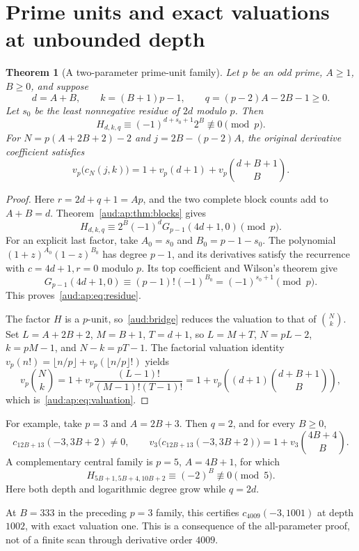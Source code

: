 \documentclass[11pt,a4paper]{article}
\numberwithin{equation}{section}
\newtheorem{theorem}{Theorem}[section]
\begin{document}
\section{Prime units and exact valuations at unbounded depth}
\begin{theorem}[A two-parameter prime-unit family]\label{aud:ap:thm:family}
Let $p$ be an odd prime, $A\ge1$, $B\ge0$, and suppose
\[
 d=A+B,\qquad k=(B+1)p-1,\qquad
 q=(p-2)A-2B-1\ge0.
\]
Let $s_0$ be the least nonnegative residue of $2d$ modulo $p$. Then
\begin{equation}\label{aud:ap:eq:residue}
 H_{d,k,q}\equiv(-1)^{d+s_0+1}2^B\not\equiv0\pmod p.
\end{equation}
For $N=p(A+2B+2)-2$ and $j=2B-(p-2)A$, the original derivative coefficient satisfies
\begin{equation}\label{aud:ap:eq:valuation}
 v_p\bigl(c_N(j,k)\bigr)
 =1+v_p(d+1)+v_p\binom{d+B+1}{B}.
\end{equation}
\end{theorem}
\begin{proof}
Here $r=2d+q+1=Ap$, and the two complete block counts add to $A+B=d$. Theorem~\ref{aud:ap:thm:blocks} gives
\[
 H_{d,k,q}\equiv2^B(-1)^dG_{p-1}(4d+1,0)\pmod p.
\]
For an explicit last factor, take $A_0=s_0$ and $B_0=p-1-s_0$. The polynomial $(1+z)^{A_0}(1-z)^{B_0}$ has degree $p-1$, and its derivatives satisfy the recurrence with $c=4d+1,r=0$ modulo $p$. Its top coefficient and Wilson's theorem give
\[
 G_{p-1}(4d+1,0)\equiv(p-1)!(-1)^{B_0}
 =(-1)^{s_0+1}\pmod p.
\]
This proves~\eqref{aud:ap:eq:residue}.

The factor $H$ is a $p$-unit, so~\eqref{aud:bridge} reduces the valuation to that of $\binom Nk$. Set $L=A+2B+2$, $M=B+1$, $T=d+1$, so $L=M+T$, $N=pL-2$, $k=pM-1$, and $N-k=pT-1$. The factorial valuation identity
$v_p(n!)=\lfloor n/p\rfloor+v_p(\lfloor n/p\rfloor!)$ yields
\[
 v_p\binom Nk
 =1+v_p\frac{(L-1)!}{(M-1)!(T-1)!}
 =1+v_p\left((d+1)\binom{d+B+1}{B}\right),
\]
which is~\eqref{aud:ap:eq:valuation}.
\end{proof}

For example, take $p=3$ and $A=2B+3$. Then $q=2$, and for every $B\ge0$,
\[
 c_{12B+13}(-3,3B+2)\ne0,\qquad
 v_3\bigl(c_{12B+13}(-3,3B+2)\bigr)
 =1+v_3\binom{4B+4}{B}.
\]
A complementary central family is $p=5$, $A=4B+1$, for which
\[
 H_{5B+1,5B+4,10B+2}\equiv(-2)^B\not\equiv0\pmod5.
\]
Here both depth and logarithmic degree grow while $q=2d$.

At $B=333$ in the preceding $p=3$ family, this certifies $c_{4009}(-3,1001)$ at depth $1002$, with exact valuation one. This is a consequence of the all-parameter proof, not of a finite scan through derivative order $4009$.
\end{document}
